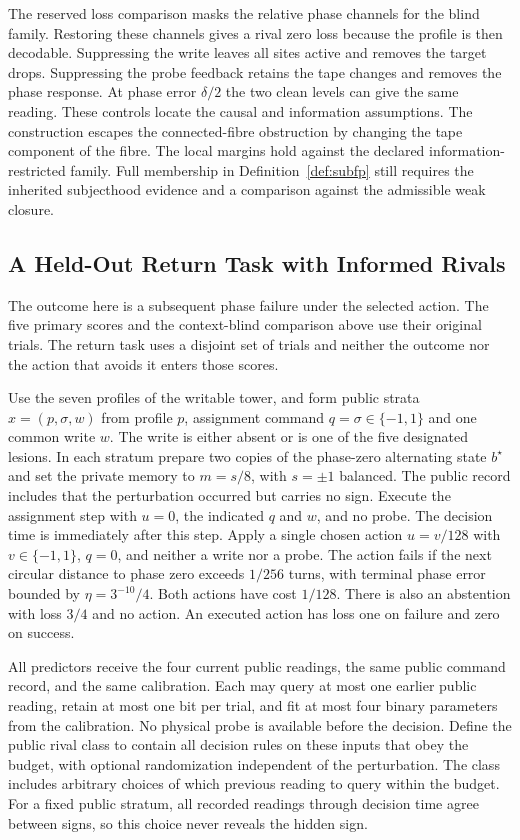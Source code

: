 \documentclass[11pt,a4paper]{article}
\theoremstyle{definition}
\begin{document}
The reserved loss comparison masks the relative phase channels for the blind family. Restoring these channels gives a rival zero loss because the profile is then decodable. Suppressing the write leaves all sites active and removes the target drops. Suppressing the probe feedback retains the tape changes and removes the phase response. At phase error $\delta/2$ the two clean levels can give the same reading. These controls locate the causal and information assumptions. The construction escapes the connected-fibre obstruction by changing the tape component of the fibre. The local margins hold against the declared information-restricted family. Full membership in Definition~\ref{def:subfp} still requires the inherited subjecthood evidence and a comparison against the admissible weak closure.

\subsection{A Held-Out Return Task with Informed Rivals}

The outcome here is a subsequent phase failure under the selected action. The five primary scores and the context-blind comparison above use their original trials. The return task uses a disjoint set of trials and neither the outcome nor the action that avoids it enters those scores.

Use the seven profiles of the writable tower, and form public strata $x=(p,\sigma,w)$ from profile $p$, assignment command $q=\sigma\in\{-1,1\}$ and one common write $w$. The write is either absent or is one of the five designated lesions. In each stratum prepare two copies of the phase-zero alternating state $b^\star$ and set the private memory to $m=s/8$, with $s=\pm1$ balanced. The public record includes that the perturbation occurred but carries no sign. Execute the assignment step with $u=0$, the indicated $q$ and $w$, and no probe. The decision time is immediately after this step. Apply a single chosen action $u=v/128$ with $v\in\{-1,1\}$, $q=0$, and neither a write nor a probe. The action fails if the next circular distance to phase zero exceeds $1/256$ turns, with terminal phase error bounded by $\eta=3^{-10}/4$. Both actions have cost $1/128$. There is also an abstention with loss $3/4$ and no action. An executed action has loss one on failure and zero on success.

All predictors receive the four current public readings, the same public command record, and the same calibration. Each may query at most one earlier public reading, retain at most one bit per trial, and fit at most four binary parameters from the calibration. No physical probe is available before the decision. Define the public rival class to contain all decision rules on these inputs that obey the budget, with optional randomization independent of the perturbation. The class includes arbitrary choices of which previous reading to query within the budget. For a fixed public stratum, all recorded readings through decision time agree between signs, so this choice never reveals the hidden sign.
\end{document}

